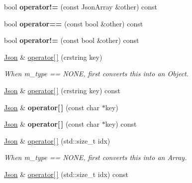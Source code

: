 \begin{DoxyCompactItemize}
bool {\bfseries operator!=} (const Json\+Array \&other) const
\item 
\mbox{\label{classnta_1_1utils_1_1Json_a5a66e88580ae3c456d16d8ec4d2d4556}} 
bool {\bfseries operator==} (const bool \&other) const
\item 
\mbox{\label{classnta_1_1utils_1_1Json_a05bb2f19f7b4239c1bbe718e8350c8d0}} 
bool {\bfseries operator!=} (const bool \&other) const
\item 
\hyperlink{classnta_1_1utils_1_1Json}{Json} \& \hyperlink{classnta_1_1utils_1_1Json_adf2d340a2bf7d59c537e398a1be66cf7}{operator\mbox{[}$\,$\mbox{]}} (crstring key)
\begin{DoxyCompactList}\small\item\em When m\+\_\+type == N\+O\+NE, first converts this into an Object. \end{DoxyCompactList}\item 
\hyperlink{classnta_1_1utils_1_1Json}{Json} \& \hyperlink{classnta_1_1utils_1_1Json_ab3b51a07ebed90330c98fd8e20785781}{operator\mbox{[}$\,$\mbox{]}} (crstring key) const
\item 
\mbox{\label{classnta_1_1utils_1_1Json_a4dcba3e4e113c3204212fea031725c9c}} 
\hyperlink{classnta_1_1utils_1_1Json}{Json} \& {\bfseries operator\mbox{[}$\,$\mbox{]}} (const char $\ast$key)
\item 
\mbox{\label{classnta_1_1utils_1_1Json_adf46f886ad73e0cacb7d0e5cc40841b3}} 
\hyperlink{classnta_1_1utils_1_1Json}{Json} \& {\bfseries operator\mbox{[}$\,$\mbox{]}} (const char $\ast$key) const
\item 
\hyperlink{classnta_1_1utils_1_1Json}{Json} \& \hyperlink{classnta_1_1utils_1_1Json_a236b5885612b74c21fbad169b21eaf55}{operator\mbox{[}$\,$\mbox{]}} (std\+::size\+\_\+t idx)
\begin{DoxyCompactList}\small\item\em When m\+\_\+type == N\+O\+NE, first converts this into an Array. \end{DoxyCompactList}\item 
\hyperlink{classnta_1_1utils_1_1Json}{Json} \& \hyperlink{classnta_1_1utils_1_1Json_a893f191111e604995488d147aaa711f8}{operator\mbox{[}$\,$\mbox{]}} (std\+::size\+\_\+t idx) const
\item 
\mbox{\label{classnta_1_1utils_1_1Json_a7d094a2061036a579a63923ae30171a4}} 

\end{DoxyCompactItemize}
